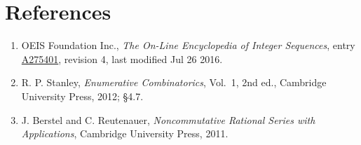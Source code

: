 \documentclass[11pt]{article}
\theoremstyle{definition}
\begin{document}
\section{References}

\begin{enumerate}

\item OEIS Foundation Inc., \emph{The On-Line Encyclopedia of Integer Sequences}, entry \href{https://oeis.org/A275401}{A275401}, revision 4, last modified Jul 26 2016.

\item R. P. Stanley, \emph{Enumerative Combinatorics}, Vol.~1, 2nd ed., Cambridge University Press, 2012; \S4.7.

\item J. Berstel and C. Reutenauer, \emph{Noncommutative Rational Series with Applications}, Cambridge University Press, 2011.

\end{enumerate}
\end{document}
